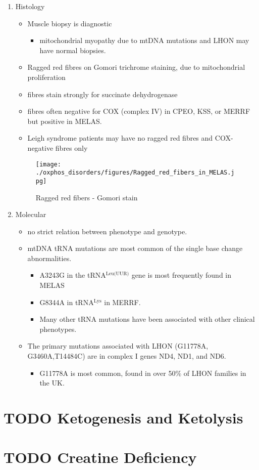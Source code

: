 \documentclass{scrartcl}
\begin{document}
\begin{enumerate}
\item Histology
\label{sec:orgda327b6}
\begin{itemize}
\item Muscle biopsy is diagnostic
\begin{itemize}
\item mitochondrial myopathy due to mtDNA mutations and LHON may have normal biopsies.
\end{itemize}
\item Ragged red fibres on Gomori trichrome staining, due to mitochondrial proliferation
\item fibres stain strongly for succinate dehydrogenase
\item fibres often negative for COX (complex IV) in CPEO, KSS, or MERRF but positive in MELAS.
\item Leigh syndrome patients may have no ragged red fibres and  COX-negative fibres only
\end{itemize}

\begin{figure}[htbp]
\centering
\texttt{[image: ./oxphos\_disorders/figures/Ragged\_red\_fibers\_in\_MELAS.jpg]}
\caption[rrf]{\label{fig:orged1045a}
Ragged red fibers - Gomori stain}
\end{figure}

\item Molecular
\label{sec:org9625404}
\begin{itemize}
\item no strict relation between phenotype and genotype.
\item mtDNA tRNA mutations are most common of the single base change abnormalities.
\begin{itemize}
\item A3243G in the tRNA\(^{\text{Leu(UUR)}}\) gene is most frequently found in MELAS
\item G8344A in tRNA\(^{\text{Lys}}\) in MERRF.
\item Many other tRNA mutations have been associated with other clinical phenotypes.
\end{itemize}
\item The primary mutations associated with LHON (G11778A, G3460A,T14484C) are in complex I genes ND4, ND1, and ND6.
\begin{itemize}
\item G11778A is most common, found in over 50\% of LHON families in the UK.
\end{itemize}
\end{itemize}
\end{enumerate}
\section{{\bfseries\sffamily TODO} Ketogenesis and Ketolysis}
\label{sec:org31fc3f9}
\section{{\bfseries\sffamily TODO} Creatine Deficiency}
\label{sec:orga5e1405}
\end{document}
